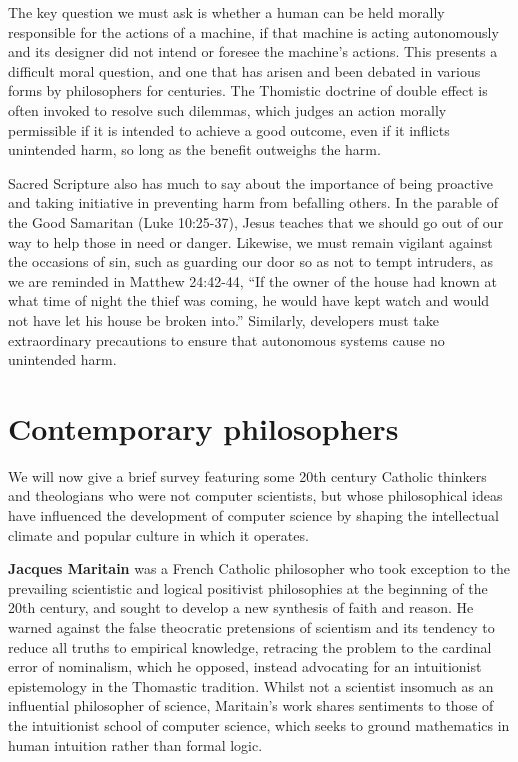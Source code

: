 \documentclass[sigplan,nonacm]{acmart}\settopmatter{printfolios=false,printccs=false,printacmref=false}
\begin{document}
The key question we must ask is whether a human can be held morally responsible for the actions of a machine, if that machine is acting autonomously and its designer did not intend or foresee the machine's actions. This presents a difficult moral question, and one that has arisen and been debated in various forms by philosophers for centuries. The Thomistic doctrine of double effect is often invoked to resolve such dilemmas, which judges an action morally permissible if it is intended to achieve a good outcome, even if it inflicts unintended harm, so long as the benefit outweighs the harm.

Sacred Scripture also has much to say about the importance of being proactive and taking initiative in preventing harm from befalling others. In the parable of the Good Samaritan (Luke 10:25-37), Jesus teaches that we should go out of our way to help those in need or danger. Likewise, we must remain vigilant against the occasions of sin, such as guarding our door so as not to tempt intruders, as we are reminded in Matthew 24:42-44, ``If the owner of the house had known at what time of night the thief was coming, he would have kept watch and would not have let his house be broken into.'' Similarly, developers must take extraordinary precautions to ensure that autonomous systems cause no unintended harm.

\section{Contemporary philosophers}

We will now give a brief survey featuring some 20th century Catholic thinkers and theologians who were not computer scientists, but whose philosophical ideas have influenced the development of computer science by shaping the intellectual climate and popular culture in which it operates.

\textbf{Jacques Maritain} was a French Catholic philosopher who took exception to the prevailing scientistic and logical positivist philosophies at the beginning of the 20th century, and sought to develop a new synthesis of faith and reason. He warned against the false theocratic pretensions of scientism and its tendency to reduce all truths to empirical knowledge, retracing the problem to the cardinal error of nominalism, which he opposed, instead advocating for an intuitionist epistemology in the Thomastic tradition. Whilst not a scientist insomuch as an influential philosopher of science, Maritain's work shares sentiments to those of the intuitionist school of computer science, which seeks to ground mathematics in human intuition rather than formal logic.
\end{document}
